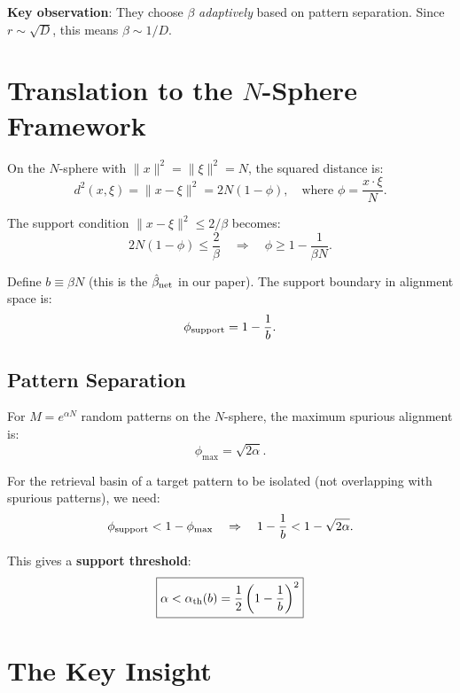 \documentclass[11pt]{article}
\newcommand{\bhat}{\hat{\beta}_{\rm net}}
\begin{document}
\textbf{Key observation}: They choose $\beta$ \emph{adaptively} based on pattern separation. Since $r \sim \sqrt{D}$, this means $\beta \sim 1/D$.

\section{Translation to the $N$-Sphere Framework}

On the $N$-sphere with $\|x\|^2 = \|\xi\|^2 = N$, the squared distance is:
\begin{equation}
    d^2(x, \xi) = \|x - \xi\|^2 = 2N(1 - \phi), \quad \text{where } \phi = \frac{x \cdot \xi}{N}.
\end{equation}

The support condition $\|x - \xi\|^2 \leq 2/\beta$ becomes:
\begin{equation}
    2N(1-\phi) \leq \frac{2}{\beta} \quad \Rightarrow \quad \phi \geq 1 - \frac{1}{\beta N}.
\end{equation}

Define $b \equiv \beta N$ (this is the $\bhat$ in our paper). The support boundary in alignment space is:
\begin{equation}
    \phi_{\rm support} = 1 - \frac{1}{b}.
\end{equation}

\subsection{Pattern Separation}

For $M = e^{\alpha N}$ random patterns on the $N$-sphere, the maximum spurious alignment is:
\begin{equation}
    \phi_{\max} = \sqrt{2\alpha}.
\end{equation}

For the retrieval basin of a target pattern to be isolated (not overlapping with spurious patterns), we need:
\begin{equation}
    \phi_{\rm support} < 1 - \phi_{\max} \quad \Rightarrow \quad 1 - \frac{1}{b} < 1 - \sqrt{2\alpha}.
\end{equation}

This gives a \textbf{support threshold}:
\begin{equation}
    \boxed{\alpha < \alpha_{\rm th}(b) = \frac{1}{2}\left(1 - \frac{1}{b}\right)^2}
\end{equation}

\section{The Key Insight}
\end{document}

